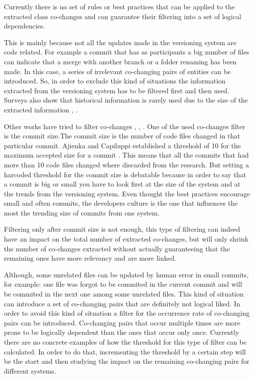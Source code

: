 \documentclass[12pt]{mitthesis}
\begin{document}
Currently there is no set of rules or best practices that can be applied to the extracted class co-changes and can guarantee their filtering into a set of logical dependencies.


This is mainly because not all the updates made in the versioning system are code related. For example a commit that has as participants a big number of files can indicate that a merge with another branch or a folder renaming has been made. In this case, a series of irrelevant co-changing pairs of entities can be introduced. So, in order to exclude this kind of situations the information extracted from the versioning system has to be filtered first and then used. Surveys also show that historical information is rarely used due to the size of the extracted information \cite{Shtern:2012:CMS:2332427.2332428}, \cite{sar}.

Other works have tried to filter co-changes \cite{Oliva:2011:ISL:2067853.2068086}, \cite{DBLP:journals/jss/AjienkaC17}, \cite{DBLP:conf/issre/OlivaG15}. One of the used co-changes filter is the commit size.The commit size is the number of code files changed in that particular commit. 
Ajienka and Capiluppi established a threshold of 10 for the maximum accepted size for a commit \cite{DBLP:journals/jss/AjienkaC17}. This means that all the commits that had more than 10 code files changed where discarded from the research. But setting a harcoded threshold for the commit size is debatable because in order to say that a commit is big or small you have to look first at the size of the system and at the trends from the versioning system. Even thought the best practices encourage small and often commits, the developers culture is the one that influences the most the trending size of commits from one system.

Filtering only after commit size is not enough, this type of filtering can indeed have an impact on the total number of extracted co-changes, but will only shrink the number of co-changes extracted without actually guaranteeing that the remaining ones have more relevancy and are more linked.

Although, some unrelated files can be updated by human error in small commits, for example: one file was forgot to be commited in the current commit and will be commited in the next one among some unrelated files. This kind of situation can introduce a set of co-changing pairs that are definitely not logical liked. In order to avoid this kind of situation a filter for the occurrence rate of co-changing pairs can be introduced. Co-changing pairs that occur multiple times are more prone to be logically dependent than the ones that occur only once. Currently there are no concrete examples of how the threshold for this type of filter can be calculated. In order to do that, incrementing the threshold by a certain step will be the start and then studying the impact on the remaining co-changing pairs for different systems. 
\end{document}

